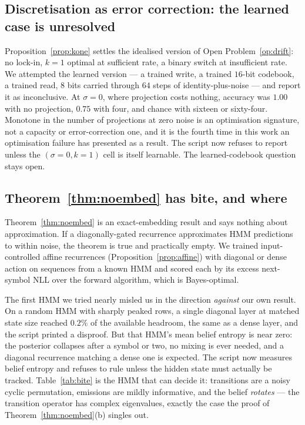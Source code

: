 \subsection{Discretisation as error correction: the learned case is unresolved}
\label{sec:exp-drift}

Proposition~\ref{prop:kone} settles the idealised version of Open
Problem~\ref{op:drift}: no lock-in, $k=1$ optimal at sufficient rate, a binary
switch at insufficient rate. We attempted the learned version --- a trained
write, a trained $16$-bit codebook, a trained read, $8$ bits carried through
$64$ steps of identity-plus-noise --- and report it as inconclusive. At
$\sigma = 0$, where projection costs nothing, accuracy was $1.00$ with no
projection, $0.75$ with four, and chance with sixteen or sixty-four. Monotone
in the number of projections at zero noise is an optimisation signature, not
a capacity or error-correction one, and it is the fourth time in this work an
optimisation failure has presented as a result. The script now refuses to
report unless the $(\sigma=0, k=1)$ cell is itself learnable. The
learned-codebook question stays open.

\subsection{Theorem~\ref{thm:noembed} has bite, and where}
\label{sec:exp-bite}

Theorem~\ref{thm:noembed} is an exact-embedding result and says nothing about
approximation. If a diagonally-gated recurrence approximates HMM predictions
to within noise, the theorem is true and practically empty. We trained
input-controlled affine recurrences (Proposition~\ref{prop:affine}) with
diagonal or dense action on sequences from a known HMM and scored each by its
excess next-symbol NLL over the forward algorithm, which is Bayes-optimal.

The first HMM we tried nearly misled us in the direction \emph{against} our
own result. On a random HMM with sharply peaked rows, a single diagonal layer
at matched state size reached $0.2\%$ of the available headroom, the same as a
dense layer, and the script printed a disproof. But that HMM's mean belief
entropy is near zero: the posterior collapses after a symbol or two, no
mixing is ever needed, and a diagonal recurrence matching a dense one is
expected. The script now measures belief entropy and refuses to rule unless
the hidden state must actually be tracked. Table~\ref{tab:bite} is the HMM
that can decide it: transitions are a noisy cyclic permutation, emissions are
mildly informative, and the belief \emph{rotates} --- the transition operator
has complex eigenvalues, exactly the case the proof of
Theorem~\ref{thm:noembed}(b) singles out.

